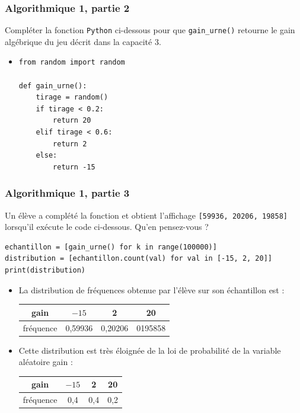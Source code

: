 \documentclass[11pt, hyperref={urlcolor=red,%
            linkcolor=blue, %
            colorlinks=true}]{beamer}
\begin{document}
\begin{frame}[fragile]

\frametitle{Algorithmique 1,  partie 2}
Compléter la fonction \texttt{Python} ci-dessous pour que \texttt{gain\_urne()} retourne le gain algébrique du jeu décrit dans la capacité 3. 

 
\begin{itemize}

\pause \item 


\begin{lstlisting}[style=rond]
from random import random

def gain_urne():
    tirage = random()
    if tirage < 0.2:
        return 20
    elif tirage < 0.6:
        return 2
    else:
        return -15
\end{lstlisting}

\end{itemize}


\end{frame}





\begin{frame}[fragile]

\frametitle{Algorithmique 1,  partie 3}
Un élève a complété la fonction et obtient l'affichage \texttt{[59936, 20206, 19858]} lorsqu'il exécute le code ci-dessous. Qu'en pensez-vous ?

\begin{lstlisting}[style=rond]
echantillon = [gain_urne() for k in range(100000)]
distribution = [echantillon.count(val) for val in [-15, 2, 20]]
print(distribution)
\end{lstlisting}


 
\begin{itemize}

\pause \item La distribution de fréquences obtenue par l'élève sur son  échantillon est :

\begin{tabular}{|c|c|c|c|}
\hline 
gain & $-15$ & 2 & 20 \\ 
\hline 
fréquence & 0,59936 & 0,20206 & 0195858 \\ 
\hline 
\end{tabular} 

\pause \item  Cette distribution est très éloignée de la loi de probabilité de la variable aléatoire gain :
\begin{tabular}{|c|c|c|c|}
\hline 
gain & $-15$ & 2 & 20 \\ 
\hline 
fréquence & 0,4 & 0,4 & 0,2 \\ 
\hline 
\end{tabular} 


\end{itemize}


\end{frame}
\end{document}
